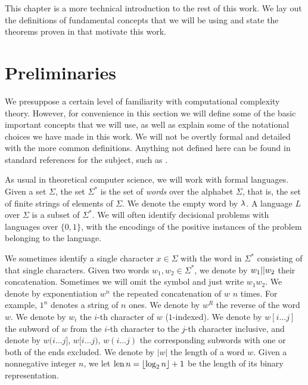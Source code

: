
This chapter is a more technical introduction to the rest of this work. 
We lay out the definitions of fundamental concepts that we will be using
and state the theorems proven in \cite{ConstructiveSeparations} that 
motivate this work. 

\section{Preliminaries}

We presuppose a certain level of familiarity with computational complexity theory. However, 
for convenience in this section we will define some of the basic important concepts 
that we will use, as well as explain some of the notational choices we have made
in this work. We will not be overtly formal and detailed with the more common definitions.
Anything not defined here can be found in standard references for the subject, 
such as \cite{AB09}.

As usual in theoretical computer science, we will work with formal languages.
Given a set $\Sigma$, the set $\Sigma^*$ is the set of \emph{words} over 
the alphabet $\Sigma$, that is, the set of finite strings of elements of $\Sigma$.
We denote the empty word by $\lambda$. 
A language $L$ over $\Sigma$ is a subset of $\Sigma^*$. We will often identify
decisional problems with languages over $\{0, 1\}$, with the encodings of the positive instances of the 
problem belonging to the language. 

We sometimes identify a single character $x \in \Sigma$ with the word in $\Sigma^*$ consisting of that
single characters. Given two words $w_1, w_2 \in \Sigma^*$, we denote by $w_1 || w_2$ their 
concatenation. Sometimes we will omit the symbol and just write $w_1w_2$. We denote by exponentiation
$w^n$ the repeated concatenation of $w$ $n$ times. For example, $1^n$ denotes a string of $n$ ones.
We denote by $w^R$ the reverse of the word $w$. We denote by $w_i$ the $i$-th character of $w$ 
($1$-indexed).
We denote by $w[i \ldots j]$ the subword of 
$w$ from the $i$-th character to the $j$-th character inclusive, and denote by 
$w(i \ldots j]$, $w[i \ldots j)$, $w(i \ldots j)$ the corresponding subwords with one or both of the
ends excluded. 
We denote by $|w|$ the length of a word $w$. Given a nonnegative integer $n$, we let 
$\operatorname{len} n = \lfloor \log_2 n \rfloor + 1$ be the length of its binary representation.  


